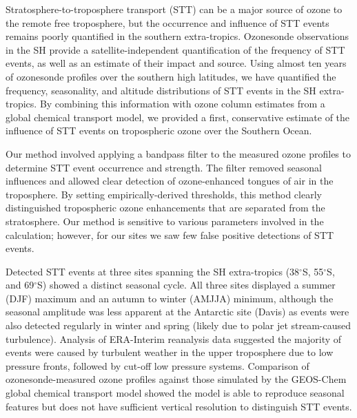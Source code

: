 \documentclass[acp, manuscript]{copernicus} %
\begin{document}
\conclusions  %
%

Stratosphere-to-troposphere transport (STT) can be a major source of ozone to the remote free troposphere, but the occurrence and influence of STT events remains poorly quantified in the southern extra-tropics.
Ozonesonde observations in the SH provide a satellite-independent quantification of the frequency of STT events, as well as an estimate of their impact and source.
Using almost ten years of ozonesonde profiles over the southern high latitudes, we have quantified the frequency, seasonality, and altitude distributions of STT events in the SH extra-tropics. 
By combining this information with ozone column estimates from a global chemical transport model, we provided a first, conservative estimate of the influence of STT events on tropospheric ozone over the Southern Ocean.

Our method involved applying a bandpass filter to the measured ozone profiles to determine STT event occurrence and strength.
The filter removed seasonal influences and allowed clear detection of ozone-enhanced tongues of air in the troposphere.
By setting empirically-derived thresholds, this method clearly distinguished tropospheric ozone enhancements that are separated from the stratosphere.
Our method is sensitive to various parameters involved in the calculation; however, for our sites we saw few false positive detections of STT events.

Detected STT events at three sites spanning the SH extra-tropics (38$^{\circ}$S, 55$^{\circ}$S, and 69$^{\circ}$S) showed a distinct seasonal cycle.
All three sites displayed a summer (DJF) maximum and an autumn to winter (AMJJA) minimum, although the seasonal amplitude was less apparent at the Antarctic site (Davis) as events were also detected regularly in winter and spring (likely due to polar jet stream-caused turbulence).
Analysis of ERA-Interim reanalysis data suggested the majority of events were caused by turbulent weather in the upper troposphere due to low pressure fronts, followed by cut-off low pressure systems.
Comparison of ozonesonde-measured ozone profiles against those simulated by the GEOS-Chem global chemical transport model showed the model is able to reproduce seasonal features but does not have sufficient vertical resolution to distinguish STT events.
\end{document}
